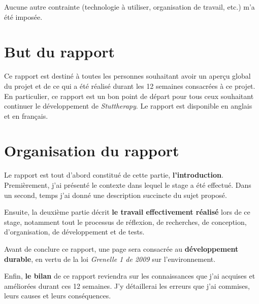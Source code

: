 Aucune autre contrainte (technologie à utiliser, organisation de travail, etc.) m'a été imposée.


\section{But du rapport}
Ce rapport est destiné à toutes les personnes souhaitant avoir un aperçu global du projet et de ce qui a été réalisé durant les 12 semaines consacrées à ce projet. En particulier, ce rapport est un bon point de départ pour tous ceux souhaitant continuer le développement de \textit{Stuttherapy}. Le rapport est disponible en anglais et en français.

\section{Organisation du rapport}

Le rapport est tout d'abord constitué de cette partie, \textbf{l'introduction}. Premièrement, j'ai présenté le contexte dans lequel le stage a été effectué. Dans un second, temps j'ai donné une description succincte du sujet proposé.

Ensuite, la deuxième partie décrit \textbf{le travail effectivement réalisé} lors de ce stage, notamment tout le processus de réflexion, de recherches, de conception, d'organisation, de développement et de tests.

Avant de conclure ce rapport, une page sera consacrée au \textbf{développement durable}, en vertu de la loi \textit{Grenelle 1 de 2009} sur l'environnement.

Enfin, \textbf{le bilan} de ce rapport reviendra sur les connaissances que j'ai acquises et améliorées durant ces 12 semaines. J'y détaillerai les erreurs que j'ai commises, leurs causes et leurs conséquences.























%
